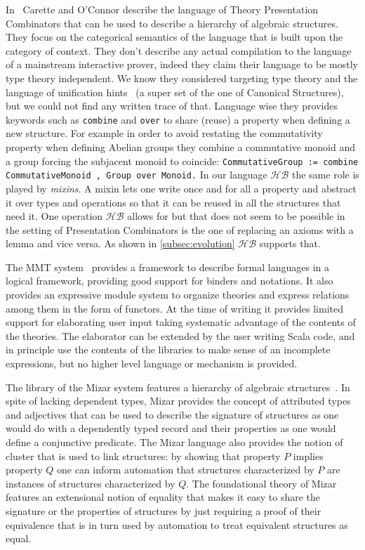 \documentclass[a4paper,UKenglish,cleveref, autoref]{lipics-v2019}
\newcommand{\HB}{\ensuremath{\mathcal{HB}}}
\newcommand{\mixin}{mixin}
\newcommand{\mixins}{mixins}
\theoremstyle{implem}
\theoremstyle{implem}
\theoremstyle{command}
\begin{document}
{{In~\cite{CaretteCombinators} Carette and O'Connor describe the language of
Theory Presentation Combinators that can be used to describe a hierarchy of
algebraic structures.
They focus on the categorical semantics of the language that is built upon
the category of context.
They don't describe any actual compilation to the language of a mainstream
interactive prover, indeed they claim their language to be mostly type theory
independent. We know they considered targeting type theory and the language
of unification hints~\cite{10.1007/978-3-642-03359-9_8}
(a super set of the one of Canonical Structures),
but we could not find any written trace of that. Language wise they provides
keywords such as \verb+combine+ and \verb+over+ to share (reuse) a property
when defining a new structure. For example in order to avoid restating
the commutativity property when defining Abelian groups they combine
a commutative monoid and a group forcing the subjacent monoid to coincide: %
\verb-CommutativeGroup := combine CommutativeMonoid , Group over Monoid.-
In our language \HB{} the same role is played by \emph{\mixins{}}.
A \mixin{} lets one write once and for all a property and abstract it over types
and operations so that it can be reused in all the structures that need it.
One operation \HB{} allows for but that does not seem to be possible in the
setting of Presentation Combinators is the one of replacing an axioms with a
lemma and vice versa. As shown in \autoref{subsec:evolution} \HB{} supports
that.

The MMT system~\cite{RABE20131} provides a framework to describe formal
languages in a logical framework, providing good support for binders and
notations. It also provides an expressive module system to organize
theories and express relations among them in the form of functors.
At the time of writing
it provides limited support for elaborating user input taking systematic
advantage of the contents of the theories. The elaborator can be extended
by the user writing Scala code, and in principle use the contents of the
libraries to make sense of an incomplete expressions, but no higher level
language or mechanism is provided.

The library of the Mizar system features a hierarchy of algebraic
structures~\cite{7733265}. In spite of lacking dependent types, Mizar
provides the concept of attributed types and adjectives
that can be used to describe the signature of structures as one would
do with a dependently typed record and their properties as
one would define a conjunctive predicate.
The Mizar language also provides the notion of cluster that is used
to link structures: by showing that property $P$ implies property $Q$
one can inform automation that structures characterized by $P$ are
instances of structures characterized by $Q$. The foundational theory of Mizar
features an extensional notion of equality that makes it easy
to share the signature or the properties of structures by just requiring
a proof of their equivalence that is in turn used by automation to treat
equivalent structures as equal.

}}
\end{document}
